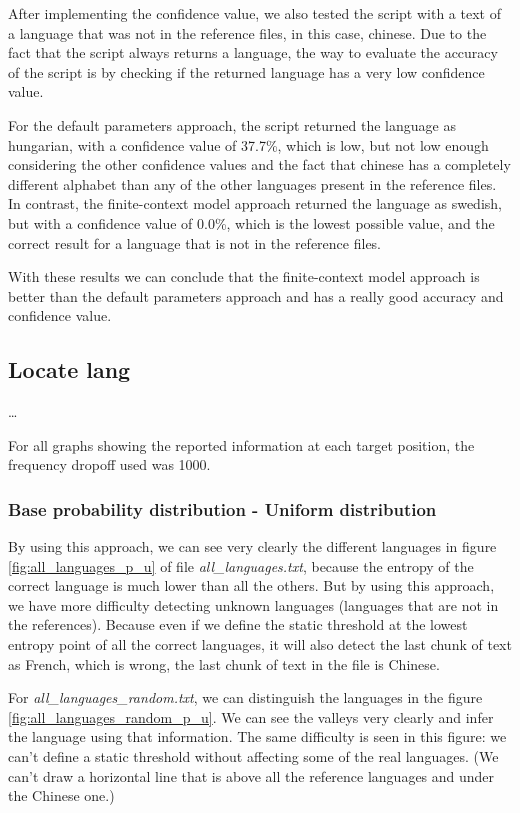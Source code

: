 \documentclass{article}
\begin{document}
After implementing the confidence value, we also tested the script with a text of a language that was not in the reference files, in this case, chinese.
Due to the fact that the script always returns a language, the way to evaluate the accuracy of the script is by checking if the returned language has a very low confidence value.

For the default parameters approach, the script returned the language as hungarian, with a confidence value of 37.7\%, which is low, but not low enough considering the other confidence values and
the fact that chinese has a completely different alphabet than any of the other languages present in the reference files.
In contrast, the finite-context model approach returned the language as swedish, but with a confidence value of 0.0\%, which is the lowest possible value, and the correct result
for a language that is not in the reference files.

With these results we can conclude that the finite-context model approach is better than the default parameters approach and has a really good accuracy and confidence value.

\subsection{Locate lang}
\label{subsec:results_locate_lang}

\dots

For all graphs showing the reported information at each target position, the frequency dropoff used was 1000.

\subsubsection{Base probability distribution - Uniform distribution}
\label{subsubsec:results_locate_lang_uniform_distribution}

By using this approach, we can see very clearly the different languages in figure \ref{fig:all_languages_p_u} of file \textit{all\_languages.txt},
because the entropy of the correct language is much lower than all the others.
But by using this approach, we have more difficulty detecting unknown languages (languages that are not in the references).
Because even if we define the static threshold at the lowest entropy point of all the correct languages,
it will also detect the last chunk of text as French, which is wrong, the last chunk of text in the file is Chinese.

For \textit{all\_languages\_random.txt}, we can distinguish the languages in the figure \ref{fig:all_languages_random_p_u}.
We can see the valleys very clearly and infer the language using that information.
The same difficulty is seen in this figure: we can't define a static threshold without affecting some of the real languages.
(We can't draw a horizontal line that is above all the reference languages and under the Chinese one.)
\end{document}
